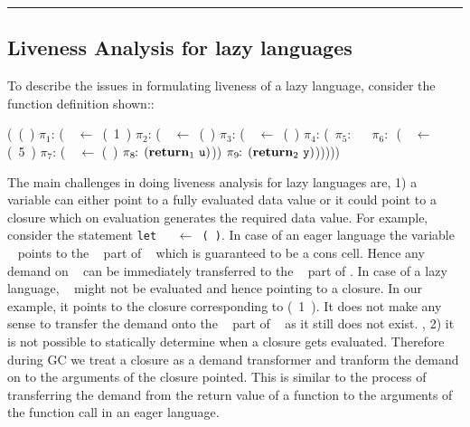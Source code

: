 \documentclass{sig-alternate}
\begin{document}
\bigskip
\hrule 
\bigskip

\subsection{Liveness Analysis for lazy languages}

To describe  the issues  in formulating liveness  of a  lazy language,
consider the function definition shown::

\renewcommand{\arraystretch}{1}{
	  \begin{uprogram}
	   (\DEFINE\ (\pf~\pa)
	    $\pi_1\!\!:\, $(\LET\ \px\ $\leftarrow $\ (\CONS~1~\px) \IN
	        $\pi_2\!\!:\, $(\LET~\py\ $\leftarrow $\ (\CDR~\px) \IN  
           \hspace*{.05cm}     $\pi_3\!\!:\,
          $(\LET\ \pz\  $\leftarrow$\   (\NULLQ~\pa) \IN
	    \hspace*{.05cm}    $\pi_4\!\!:\,
          $(\SIF\ $\pi_5\!\!:\,$ \pz\ ~$\pi_6\!\!:\,$ (\LET~\ww\  $\leftarrow$  (\take~5~\px) \IN
	   \hspace*{1.15cm}    $\pi_7\!\!:\, $(\LET~\pu\  $\leftarrow$  (\CDR~\pw)  \IN
	    \hspace*{1.15cm}   $\pi_8\!\!:\,(\mbox{$\mathbf{ return}$}_1~\mbox{\tt u})$))
           \hspace*{.05cm} $\pi_9\!\!:\, (\mbox{$\mathbf{ return}$}_2~\mbox{\tt y})$)))))
	\end{uprogram}}

The main challenges in doing liveness analysis for lazy languages are, 
1) a variable can either point to a fully evaluated data value or it 
could point to a closure which on evaluation generates the required data value. For example, 
consider the statement {\tt let \py~ $\leftarrow $ (\CDR~\px)}. In case of an eager language 
the variable \py~ points to  the \CDR~ part of \px~ which is guaranteed to be a cons cell. 
Hence any demand on \py~ can be immediately transferred to the \CDR~ part of \px. In case of 
a lazy language, \px~ might not be evaluated and  hence pointing to a closure. In our 
example, it points to the closure corresponding to (\CONS~1~\px). It does not make any sense 
to transfer the demand onto the \CDR~ part of \px~ as it still does not exist.
, 2) it is not possible to statically determine when a closure gets evaluated.  Therefore 
during GC we treat a closure as a demand transformer and tranform the demand on to the arguments 
of the closure pointed. This is similar to the process of transferring the demand 
from the return value of a function to the arguments of the function call in an eager language. 
\end{document}
